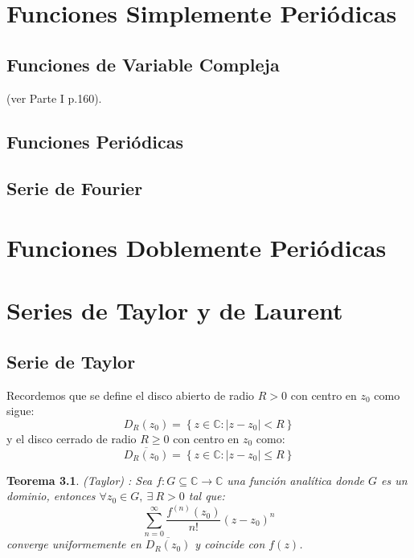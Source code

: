 \documentclass[spanish, openright,oneside]{book}
\newtheorem{teo}{Teorema}[chapter]
\theoremstyle{definition}
\begin{document}
\chapter{Funciones Simplemente Periódicas}\label{cap.fsp}

\section{Funciones de Variable Compleja}
\label{C}
(ver \cite{marku2005} Parte I p.160).


\section{Funciones Periódicas}

\section{Serie de Fourier}


\chapter{Funciones Doblemente Periódicas}\label{cap.fdp}
\label{R}

\appendix 
\chapter{Series de Taylor y de Laurent }\label{aped.A}
\section*{Serie de Taylor \ \textbf{\textsf{\cite{marsd1996}}}  }

Recordemos que se define el disco abierto de radio $R > 0$ con centro en $z_0$ como sigue:
\[
D_R(z_0)=\left\{ z\in\mathbb{C} : |z-z_0|<R\right\}
\]
y el disco cerrado de radio $R\geq0$ con centro en $z_0$ como:
\[
\overline{D_R(z_0)}=\left\{ z\in\mathbb{C} : |z-z_0|\leq R\right\}
\]
\begin{teo}\label{teotay}{(Taylor) :}
Sea $f:G\subseteq\mathbb{C}\rightarrow \mathbb{C}$ una función analítica donde $G$ es un dominio, entonces $\forall z_0 \in G, \ \exists \ R>0 $ tal que:
\[
\sum_{n=0}^\infty\frac{f^{(n)}(z_0)}{n!}(z-z_0)^n
\]
converge uniformemente en $\overline{D_R(z_0)}$ y coincide con $f(z)$.
\end{teo}
\end{document}
